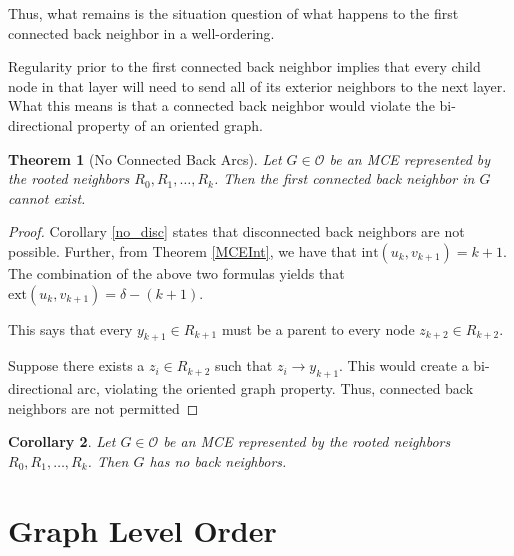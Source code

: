 \documentclass[AMS, Times1COL]{article} %
\newtheorem{theorem}{Theorem}[section]
\newtheorem{corollary}[theorem]{Corollary}
\theoremstyle{definition}
\begin{document}
	Thus, what remains is the situation question of what happens to the first connected back neighbor in a well-ordering. 
	
	Regularity prior to the first connected back neighbor implies that every child node in that layer will need to send all of its exterior neighbors to the next layer. What this means is that a connected back neighbor would violate the bi-directional property of an oriented graph. 
	
	\begin{theorem}[No Connected Back Arcs]
		Let $G\in\mathcal{O}$ be an MCE represented by the rooted neighbors $R_0, R_1, \ldots, R_k$. Then the first connected back neighbor in $G$ cannot exist. 
		\label{no_conn}
	\end{theorem}
	\begin{proof}
		Corollary \ref {no_disc} states that disconnected back neighbors are not possible. Further, from Theorem \ref{MCEInt}, we have that $\text{int}(u_k, v_{k+1}) = k+1$. The combination of the above two formulas yields that $\text{ext}(u_k, v_{k+1}) = \delta - (k+1)$.
		
		This says that every $y_{k+1} \in R_{k+1}$ must be a parent to every node $z_{k+2} \in R_{k+2}$. 
		
		Suppose there exists a $z_i \in R_{k+2}$ such that $z_i \to y_{k+1}$. This would create a bi-directional arc, violating the oriented graph property. Thus, connected back neighbors are not permitted 
	\end{proof}
	
	\begin{corollary}
		Let $G\in\mathcal{O}$ be an MCE represented by the rooted neighbors $R_0, R_1, \ldots, R_k$. Then $G$ has no back neighbors. 
		\label{no_back}
	\end{corollary}
	
	\section{Graph Level Order} \label{glover}
	
\end{document}
